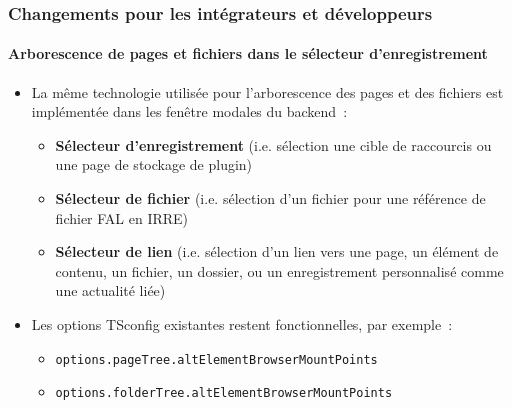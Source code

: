 %

\begin{frame}[fragile]
	\frametitle{Changements pour les intégrateurs et développeurs}
	\framesubtitle{Arborescence de pages et fichiers dans le sélecteur d'enregistrement}


	\begin{itemize}
		\item La même technologie utilisée pour l'arborescence des pages et des fichiers est
			implémentée dans les fenêtre modales du backend~:
			\begin{itemize}\normalsize
				\item \textbf{Sélecteur d'enregistrement}\newline
					\smaller(i.e. sélection une cible de raccourcis ou une page de stockage de plugin)\normalsize
				\item \textbf{Sélecteur de fichier}\newline
				 	\smaller(i.e. sélection d'un fichier pour une référence de fichier FAL en IRRE)\normalsize
				\item \textbf{Sélecteur de lien}\newline
					\smaller(i.e. sélection d'un lien vers une page, un élément de contenu, un fichier, un dossier,  ou un enregistrement personnalisé comme une actualité liée)\normalsize
			\end{itemize}

		\item Les options TSconfig existantes restent fonctionnelles, par exemple~:

			\begin{itemize}\smaller
				\item \texttt{options.pageTree.altElementBrowserMountPoints}
				\item \texttt{options.folderTree.altElementBrowserMountPoints}
			\end{itemize}\smaller
	\end{itemize}

\end{frame}


